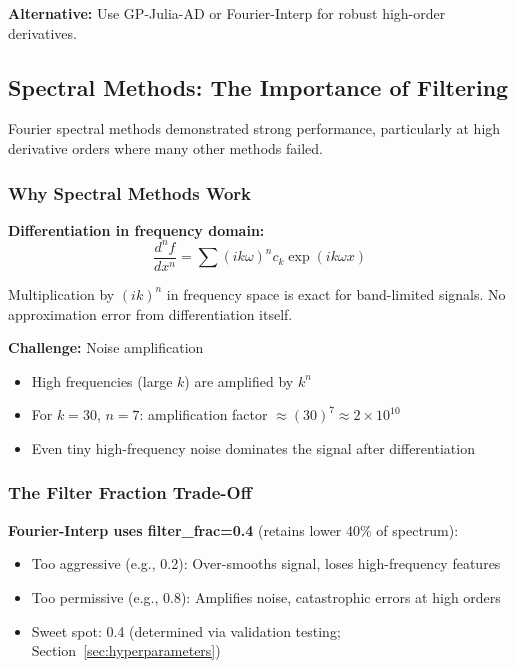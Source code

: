 \textbf{Alternative:} Use GP-Julia-AD or Fourier-Interp for robust high-order derivatives.

\subsection{Spectral Methods: The Importance of Filtering}
\label{sec:spectral_filtering}

Fourier spectral methods demonstrated strong performance, particularly at high derivative orders where many other methods failed.

\subsubsection{Why Spectral Methods Work}

\textbf{Differentiation in frequency domain:}
\begin{equation}
\frac{d^n f}{dx^n} = \sum (i k \omega)^n c_k \exp(i k \omega x)
\end{equation}

Multiplication by $(ik)^n$ in frequency space is exact for band-limited signals. No approximation error from differentiation itself.

\textbf{Challenge:} Noise amplification
\begin{itemize}
    \item High frequencies (large $k$) are amplified by $k^n$
    \item For $k=30$, $n=7$: amplification factor $\approx (30)^7 \approx 2 \times 10^{10}$
    \item Even tiny high-frequency noise dominates the signal after differentiation
\end{itemize}

\subsubsection{The Filter Fraction Trade-Off}

\textbf{Fourier-Interp uses filter\_frac=0.4} (retains lower 40\% of spectrum):
\begin{itemize}
    \item Too aggressive (e.g., 0.2): Over-smooths signal, loses high-frequency features
    \item Too permissive (e.g., 0.8): Amplifies noise, catastrophic errors at high orders
    \item Sweet spot: 0.4 (determined via validation testing; Section~\ref{sec:hyperparameters})
\end{itemize}

